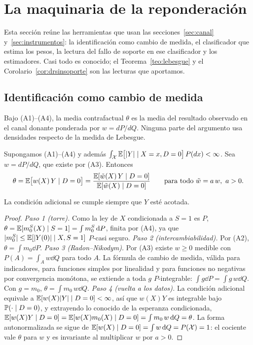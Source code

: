 \section{La maquinaria de la reponderación}\label{sec:identificacion}

Esta sección reúne las herramientas que usan las secciones~\ref{sec:canal} y~\ref{sec:instrumentos}: la identificación como cambio de medida, el clasificador que estima los pesos, la lectura del fallo de soporte en ese clasificador y los estimadores. Casi todo es conocido; el Teorema~\ref{teo:lebesgue} y el Corolario~\ref{cor:drsinsoporte} son las lecturas que aportamos.

\subsection{Identificación como cambio de medida}

Bajo (A1)--(A4), la media contrafactual $\theta$ es la media del resultado observado en el canal donante ponderada por $w=dP/dQ$. Ninguna parte del argumento usa densidades respecto de la medida de Lebesgue.

\begin{teorema}[Identificación]\label{teo:identificacion}
Supongamos (A1)--(A4) y además $\int_{\mathcal{X}}\mathbb{E}\bigl[|Y|\mid X=x,D=0\bigr]\,P(dx)<\infty$. Sea $w=dP/dQ$, que existe por (A3). Entonces
\[
\theta=\mathbb{E}\bigl[w(X)\,Y\mid D=0\bigr]=\frac{\mathbb{E}[\tilde w(X)\,Y\mid D=0]}{\mathbb{E}[\tilde w(X)\mid D=0]}\qquad\text{para todo }\tilde w=a\,w,\ a>0.
\]
\end{teorema}
La condición adicional se cumple siempre que $Y$ esté acotada.

\begin{proof}
\emph{Paso 1 (torre).} Como la ley de $X$ condicionada a $S=1$ es $P$, $\theta=\mathbb{E}[m_0^S(X)\mid S=1]=\int m_0^S\,\mathrm{d} P$, finita por (A4), ya que $|m_0^S|\le\mathbb{E}[|Y(0)|\mid X,S=1]$ $P$-casi seguro.
\emph{Paso 2 (intercambiabilidad).} Por (A2), $\theta=\int m_0\dd P$.
\emph{Paso 3 (Radon--Nikodym).} Por (A3) existe $w\ge0$ medible con $P(A)=\int_A w\dd Q$ para todo $A$. La fórmula de cambio de medida, válida para indicadores, para funciones simples por linealidad y para funciones no negativas por convergencia monótona, se extiende a toda $g$ $P$-integrable: $\int g\dd P=\int g\,w\dd Q$. Con $g=m_0$, $\theta=\int m_0\,w\dd Q$.
\emph{Paso 4 (vuelta a los datos).} La condición adicional equivale a $\mathbb{E}[w(X)|Y|\mid D=0]<\infty$, así que $w(X)Y$ es integrable bajo $\mathbb{P}(\cdot\mid D=0)$, y extrayendo lo conocido de la esperanza condicionada, $\mathbb{E}[w(X)Y\mid D=0]=\mathbb{E}[w(X)m_0(X)\mid D=0]=\int m_0\,w\,\mathrm{d} Q=\theta$.
La forma autonormalizada se sigue de $\mathbb{E}[w(X)\mid D=0]=\int w\,\mathrm{d} Q=P(\mathcal{X})=1$: el cociente vale $\theta$ para $w$ y es invariante al multiplicar $w$ por $a>0$.
\end{proof}

